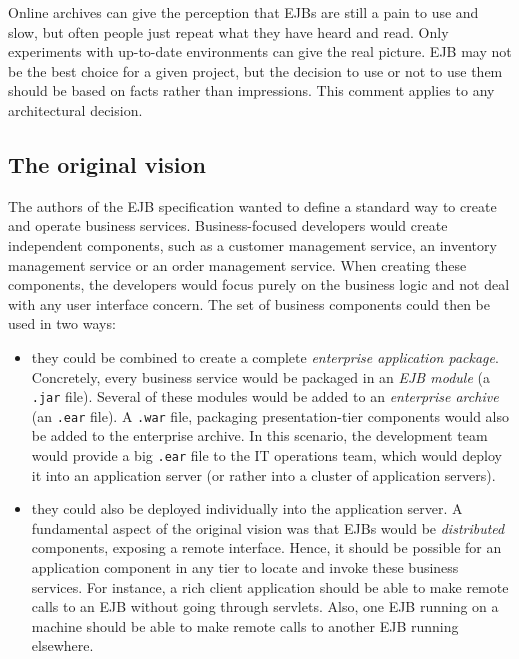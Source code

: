Online archives can give the perception that \ac{EJB}s are still a pain to use and slow, but often people just repeat what they have heard and read. Only experiments with up-to-date environments can give the real picture. \ac{EJB} may not be the best choice for a given project, but the decision to use or not to use them should be based on facts rather than impressions. This comment applies to any architectural decision.

\subsection{The original vision}

The authors of the \ac{EJB} specification wanted to define a standard way to create and operate business services. Business-focused developers would create independent components, such as a customer management service, an inventory management service or an order management service. When creating these components, the developers would focus purely on the business logic and not deal with any user interface concern. The set of business components could then be used in two ways:

\begin{itemize}
\item they could be combined to create a complete \emph{enterprise application package}. Concretely, every business service would be packaged in an \emph{\ac{EJB} module} (a \texttt{.jar} file). Several of these modules would be added to an \emph{enterprise archive} (an \texttt{.ear} file). A \texttt{.war} file, packaging presentation-tier components would also be added to the enterprise archive. In this scenario, the development team would provide a big \texttt{.ear} file to the IT operations team, which would deploy it into an application server (or rather into a cluster of application servers).
\item they could also be deployed individually into the application server. A fundamental aspect of the original vision was that \ac{EJB}s would be \emph{distributed} components, exposing a remote interface. Hence, it should be possible for an application component in any tier to locate and invoke these business services. For instance, a rich client application should be able to make remote calls to an \ac{EJB} without going through servlets. Also, one \ac{EJB} running on a machine should be able to make remote calls to another \ac{EJB} running elsewhere.
\end{itemize}

